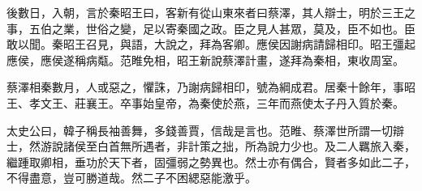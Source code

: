 後數日，入朝，言於秦昭王曰，客新有從山東來者曰蔡澤，其人辯士，明於三王之事，五伯之業，世俗之變，足以寄秦國之政。臣之見人甚眾，莫及，臣不如也。臣敢以聞。秦昭王召見，與語，大說之，拜為客卿。應侯因謝病請歸相印。昭王彊起應侯，應侯遂稱病甐。范睢免相，昭王新說蔡澤計畫，遂拜為秦相，東收周室。

蔡澤相秦數月，人或惡之，懼誅，乃謝病歸相印，號為綱成君。居秦十餘年，事昭王、孝文王、莊襄王。卒事始皇帝，為秦使於燕，三年而燕使太子丹入質於秦。

太史公曰，韓子稱長袖善舞，多錢善賈，信哉是言也。范睢、蔡澤世所謂一切辯士，然游說諸侯至白首無所遇者，非計策之拙，所為說力少也。及二人羈旅入秦，繼踵取卿相，垂功於天下者，固彊弱之勢異也。然士亦有偶合，賢者多如此二子，不得盡意，豈可勝道哉。然二子不困緦惡能激乎。